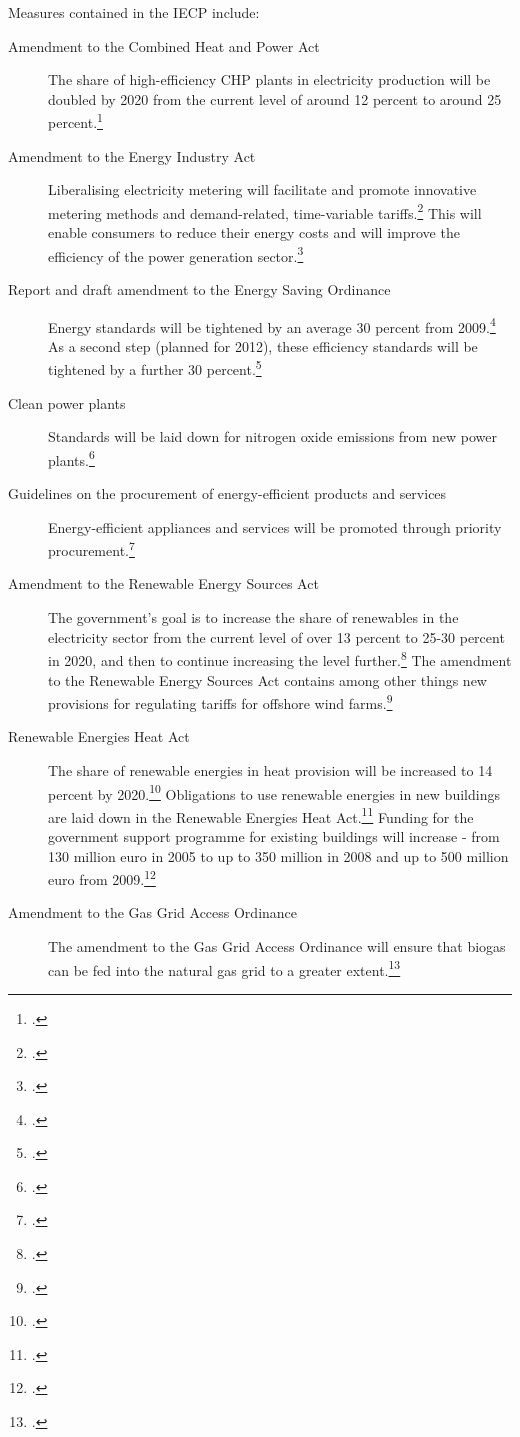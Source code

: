 Measures contained in the IECP include:
\begin{description}
	\item[Amendment to the Combined Heat and Power Act] The share of high-efficiency CHP plants in electricity production will be doubled by 2020 from the current level of around 12 percent to around 25 percent.\footcite[][]{BMUprogramme}
	\item[Amendment to the Energy Industry Act] Liberalising electricity metering will facilitate and promote innovative metering methods and demand-related, time-variable tariffs.\footcite[][]{BMUprogramme}
	This will enable consumers to reduce their energy costs and will improve the efficiency of the power generation sector.\footcite[][]{BMUprogramme}
	\item[Report and draft amendment to the Energy Saving Ordinance] Energy standards will be tightened by an average 30 percent from 2009.\footcite[][]{BMUprogramme}
	As a second step (planned for 2012), these efficiency standards will be tightened by a further 30 percent.\footcite[][]{BMUprogramme}
	\item[Clean power plants] Standards will be laid down for nitrogen oxide emissions from new power plants.\footcite[][]{BMUprogramme}
	\item[Guidelines on the procurement of energy-efficient products and services] Energy-efficient appliances and services will be promoted through priority procurement.\footcite[][]{BMUprogramme}
	\item[Amendment to the Renewable Energy Sources Act] The government’s goal is to increase the share of renewables in the electricity sector from the current level of over 13 percent to 25-30 percent in 2020, and then to continue increasing the level further.\footcite[][]{BMUprogramme}
	The amendment to the Renewable Energy Sources Act contains among other things new provisions for regulating tariffs for offshore wind farms.\footcite[][]{BMUprogramme}
	\item[Renewable Energies Heat Act] The share of renewable energies in heat provision will be increased to 14 percent by 2020.\footcite[][]{BMUprogramme}
	Obligations to use renewable energies in new buildings are laid down in the Renewable Energies Heat Act.\footcite[][]{BMUprogramme}
	Funding for the government support programme for existing buildings will increase - from 130 million euro in 2005 to up to 350 million in 2008 and up to 500 million euro from 2009.\footcite[][]{BMUprogramme}
	\item[Amendment to the Gas Grid Access Ordinance] The amendment to the Gas Grid Access Ordinance will ensure that biogas can be fed into the natural gas grid to a greater extent.\footcite[][]{BMUprogramme}

\end{description}
